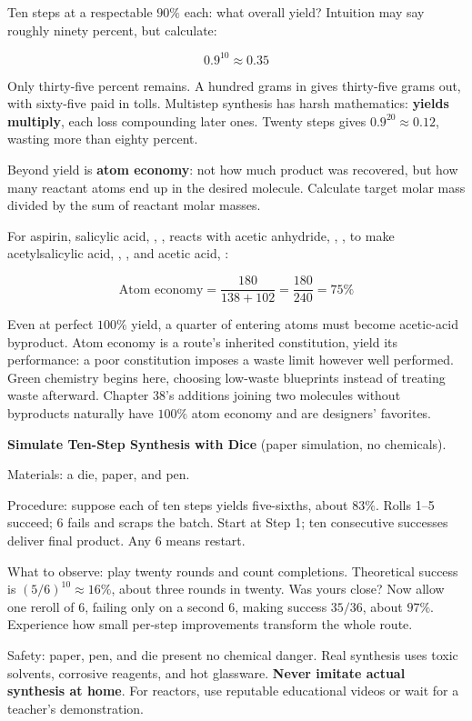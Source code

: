 Ten steps at a respectable $90\%$ each: what overall yield? Intuition may say roughly ninety percent, but calculate:

\[0.9^{10}\approx 0.35\]

Only thirty-five percent remains. A hundred grams in gives thirty-five grams out, with sixty-five paid in tolls. Multistep synthesis has harsh mathematics: \textbf{yields multiply}, each loss compounding later ones. Twenty steps gives $0.9^{20}\approx 0.12$, wasting more than eighty percent.

\begin{qiaoliang}
Beyond yield is \textbf{atom economy}: not how much product was recovered, but how many reactant atoms end up in the desired molecule. Calculate target molar mass divided by the sum of reactant molar masses.

For aspirin, salicylic acid, , , reacts with acetic anhydride, , , to make acetylsalicylic acid, , , and acetic acid, :

\[\text{Atom economy}=\frac{180}{138+102}=\frac{180}{240}=75\%\]

Even at perfect $100\%$ yield, a quarter of entering atoms must become acetic-acid byproduct. Atom economy is a route's inherited constitution, yield its performance: a poor constitution imposes a waste limit however well performed. Green chemistry begins here, choosing low-waste blueprints instead of treating waste afterward. Chapter 38's additions joining two molecules without byproducts naturally have $100\%$ atom economy and are designers' favorites.
\end{qiaoliang}

\begin{shiyan}
\textbf{Simulate Ten-Step Synthesis with Dice} (paper simulation, no chemicals).

Materials: a die, paper, and pen.

Procedure: suppose each of ten steps yields five-sixths, about $83\%$. Rolls 1–5 succeed; 6 fails and scraps the batch. Start at Step 1; ten consecutive successes deliver final product. Any 6 means restart.

What to observe: play twenty rounds and count completions. Theoretical success is $(5/6)^{10}\approx 16\%$, about three rounds in twenty. Was yours close? Now allow one reroll of 6, failing only on a second 6, making success $35/36$, about $97\%$. Experience how small per-step improvements transform the whole route.

Safety: paper, pen, and die present no chemical danger. Real synthesis uses toxic solvents, corrosive reagents, and hot glassware. \textbf{Never imitate actual synthesis at home}. For reactors, use reputable educational videos or wait for a teacher's demonstration.
\end{shiyan}

